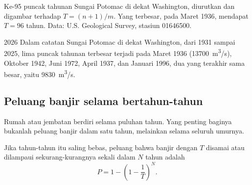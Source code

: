 \begin{omfigure}

{\small Ke-\num{95} puncak tahunan Sungai Potomac di dekat Washington,
diurutkan dan digambar terhadap  $T = (n+1)/m$. Yang terbesar,
pada Maret 1936, mendapat $T = 96$ tahun. Data: U.S. Geological Survey,
stasiun 01646500.}
\end{omfigure}

\begin{dated}{2026}
Dalam catatan Sungai Potomac di dekat Washington, dari 1931 sampai 2025, lima
puncak tahunan terbesar terjadi pada Maret 1936 (\qty{13700}{m^3/s}), Oktober
1942, Juni 1972, April 1937, dan Januari 1996, dua yang terakhir sama besar,
yaitu \qty{9830}{m^3/s}.
\end{dated}

\subsection*{Peluang banjir selama bertahun-tahun}

Rumah atau jembatan berdiri selama puluhan tahun. Yang penting baginya bukanlah
peluang banjir dalam satu tahun, melainkan selama seluruh umurnya.

\begin{proposition}\label{prop:g10:drainage-basins:chance}
Jika tahun-tahun itu saling bebas, peluang bahwa banjir dengan 
$T$ disamai atau dilampaui sekurang-kurangnya sekali dalam $N$ tahun adalah
\[
P = 1 - \left(1 - \frac{1}{T}\right)^{N}.
\]
\end{proposition}

